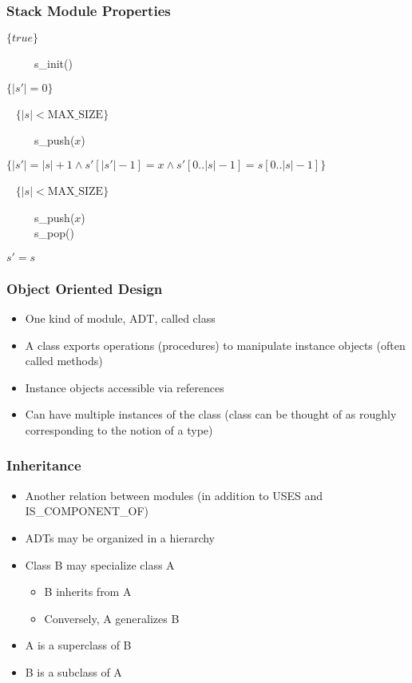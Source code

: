 \documentclass[t,12pt,numbers,fleqn,handout]{beamer}
\begin{document}
\begin{frame}
\frametitle{Stack Module Properties}

$\{ \mathit{true} \}$

~~~~~s\_init()

$\{ | s' | = 0 \}$

~\newline
$\{ | s | < \mbox{MAX\_SIZE} \}$

~~~~~s\_push($x$)

$\{ | s' | = | s | + 1 \wedge s'[|s'| - 1] = x \wedge s'[0..|s|-1] = s[0..|s|-1] \}$

~\newline
$\{ |s| < \mbox{MAX\_SIZE} \}$

~~~~~s\_push($x$)\\
~~~~~s\_pop()

$s' = s$

\end{frame}


\begin{frame}
\frametitle{Object Oriented Design}
\begin{itemize}
\item One kind of module, ADT, called class
\item A class exports operations (procedures) to manipulate instance objects (often called methods)
\item Instance objects accessible via references
\item Can have multiple instances of the class (class can be thought of as roughly corresponding to the notion of a type)
\end{itemize}
\end{frame}


\begin{frame}
\frametitle{Inheritance}
\begin{itemize}
\item Another relation between modules (in addition to USES and IS\_COMPONENT\_OF)
\item ADTs may be organized in a hierarchy
\item Class B may specialize class A
\begin{itemize}
\item B inherits from A
\item Conversely, A generalizes B
\end{itemize}
\item A is a superclass of B
\item B is a subclass of A
\end{itemize}
\end{frame}
\end{document}
